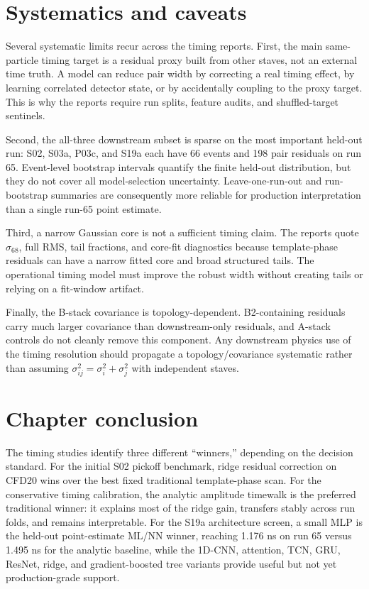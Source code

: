 \section{Systematics and caveats}

Several systematic limits recur across the timing reports.  First, the main
same-particle timing target is a residual proxy built from other staves, not an
external time truth.  A model can reduce pair width by correcting a real timing
effect, by learning correlated detector state, or by accidentally coupling to
the proxy target.  This is why the reports require run splits, feature audits,
and shuffled-target sentinels.

Second, the all-three downstream subset is sparse on the most important held-out
run: S02, S03a, P03c, and S19a each have 66 events and 198 pair residuals on run
65.  Event-level bootstrap intervals quantify the finite held-out distribution,
but they do not cover all model-selection uncertainty.  Leave-one-run-out and
run-bootstrap summaries are consequently more reliable for production
interpretation than a single run-65 point estimate.

Third, a narrow Gaussian core is not a sufficient timing claim.  The reports
quote \(\sigma_{68}\), full RMS, tail fractions, and core-fit diagnostics because
template-phase residuals can have a narrow fitted core and broad structured
tails.  The operational timing model must improve the robust width without
creating tails or relying on a fit-window artifact.

Finally, the B-stack covariance is topology-dependent.  B2-containing residuals
carry much larger covariance than downstream-only residuals, and A-stack
controls do not cleanly remove this component.  Any downstream physics use of
the timing resolution should propagate a topology/covariance systematic rather
than assuming \(\sigma^2_{ij}=\sigma_i^2+\sigma_j^2\) with independent staves.

\section{Chapter conclusion}

The timing studies identify three different ``winners,'' depending on the
decision standard.  For the initial S02 pickoff benchmark, ridge residual
correction on CFD20 wins over the best fixed traditional template-phase scan.
For the conservative timing calibration, the analytic amplitude timewalk is the
preferred traditional winner: it explains most of the ridge gain, transfers
stably across run folds, and remains interpretable.  For the S19a architecture
screen, a small MLP is the held-out point-estimate ML/NN winner, reaching
1.176 ns on run 65 versus 1.495 ns for the analytic baseline, while the 1D-CNN,
attention, TCN, GRU, ResNet, ridge, and gradient-boosted tree variants provide
useful but not yet production-grade support.

